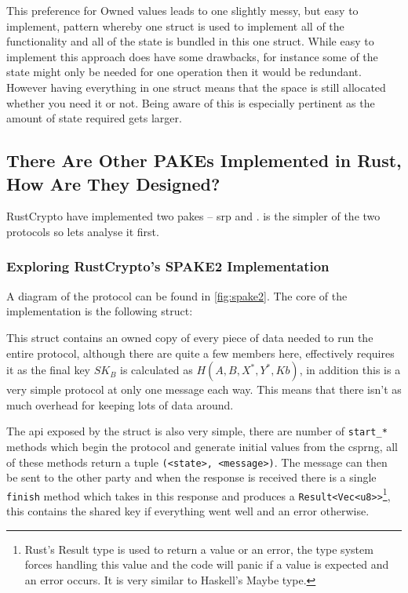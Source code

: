 This preference for Owned values leads to one slightly messy, but easy to implement, pattern whereby one struct is used to implement all of the functionality and all of the state is bundled in this one struct.
While easy to implement this approach does have some drawbacks, for instance some of the state might only be needed for one operation then it would be redundant.
However having everything in one struct means that the space is still allocated whether you need it or not.
Being aware of this is especially pertinent as the amount of state required gets larger.

\subsection{There Are Other PAKEs Implemented in Rust, How Are They Designed?}
RustCrypto have implemented two \glspl{pake} -- \gls{srp} and .
 is the simpler of the two protocols so lets analyse it first.

\subsubsection{Exploring RustCrypto's SPAKE2 Implementation}
A diagram of the  protocol can be found in \cref{fig:spake2}.
The core of the implementation is the following struct:

This struct contains an owned copy of every piece of data needed to run the entire protocol, although there are quite a few members here,  effectively requires it as the final key $SK_B$ is calculated as $H(A, B, X^*, Y^*, Kb)$, in addition this is a very simple protocol at only one message each way.
This means that there isn't as much overhead for keeping lots of data around.

The \gls{api} exposed by the struct is also very simple, there are number of \texttt{start\_*} methods which begin the protocol and generate initial values from the \gls{csprng}, all of these methods return a tuple \texttt{(<state>, <message>)}.
The message can then be sent to the other party and when the response is received there is a single \texttt{finish} method which takes in this response and produces a \texttt{Result<Vec<u8>>}\footnote{Rust's Result type is used to return a value or an error, the type system forces handling this value and the code will panic if a value is expected and an error occurs. It is very similar to Haskell's Maybe type.}, this contains the shared key if everything went well and an error otherwise.

